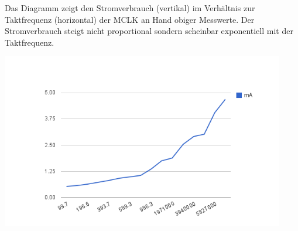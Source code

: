 Das Diagramm zeigt den Stromverbrauch (vertikal) im Verhältnis zur Taktfrequenz (horizontal) der MCLK an Hand obiger Messwerte. Der Stromverbrauch steigt nicht proportional sondern scheinbar exponentiell mit der Taktfrequenz.

\includegraphics[width=0.93\textwidth]{aufgaben/06/chart_1.png}
